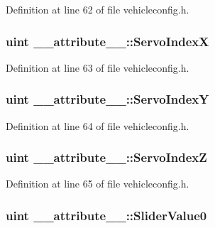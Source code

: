Definition at line 62 of file vehicleconfig.\-h.

\hypertarget{group___config_plugin_ga0d592171bd6f7381c2a33dfed5f7c40d}{
\subsubsection[{Servo\-Index\-X}]{\setlength{\rightskip}{0pt plus 5cm}uint \-\_\-\-\_\-attribute\-\_\-\-\_\-\-::\-Servo\-Index\-X}}\label{group___config_plugin_ga0d592171bd6f7381c2a33dfed5f7c40d}


Definition at line 63 of file vehicleconfig.\-h.

\hypertarget{group___config_plugin_ga517baa5d4109f802400efeb8a5897b1b}{
\subsubsection[{Servo\-Index\-Y}]{\setlength{\rightskip}{0pt plus 5cm}uint \-\_\-\-\_\-attribute\-\_\-\-\_\-\-::\-Servo\-Index\-Y}}\label{group___config_plugin_ga517baa5d4109f802400efeb8a5897b1b}


Definition at line 64 of file vehicleconfig.\-h.

\hypertarget{group___config_plugin_ga661c3e27f6844865ea7244fa1363516e}{
\subsubsection[{Servo\-Index\-Z}]{\setlength{\rightskip}{0pt plus 5cm}uint \-\_\-\-\_\-attribute\-\_\-\-\_\-\-::\-Servo\-Index\-Z}}\label{group___config_plugin_ga661c3e27f6844865ea7244fa1363516e}


Definition at line 65 of file vehicleconfig.\-h.

\hypertarget{group___config_plugin_ga2787c0bb4ab205071860d7a5c90cb7a6}{
\subsubsection[{Slider\-Value0}]{\setlength{\rightskip}{0pt plus 5cm}uint \-\_\-\-\_\-attribute\-\_\-\-\_\-\-::\-Slider\-Value0}}\label{group___config_plugin_ga2787c0bb4ab205071860d7a5c90cb7a6}


